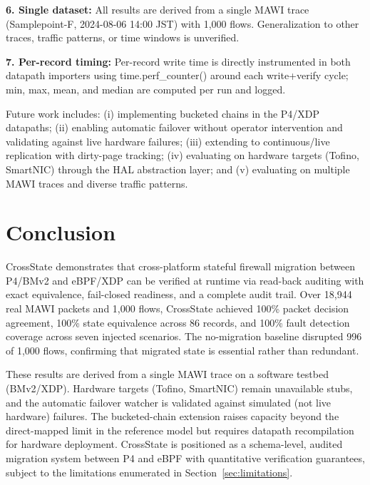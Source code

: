 \documentclass[10pt, conference]{IEEEtran}
\begin{document}
\textbf{6. Single dataset:} All results are derived from a single MAWI trace (Samplepoint-F, 2024-08-06 14:00 JST) with 1,000 flows. Generalization to other traces, traffic patterns, or time windows is unverified.

\textbf{7. Per-record timing:} Per-record write time is directly instrumented in both datapath importers using time.perf\_counter() around each write+verify cycle; min, max, mean, and median are computed per run and logged.

Future work includes: (i) implementing bucketed chains in the P4/XDP datapaths; (ii) enabling automatic failover without operator intervention and validating against live hardware failures; (iii) extending to continuous/live replication with dirty-page tracking; (iv) evaluating on hardware targets (Tofino, SmartNIC) through the HAL abstraction layer; and (v) evaluating on multiple MAWI traces and diverse traffic patterns.

\section{Conclusion}
\label{sec:conclusion}
CrossState demonstrates that cross-platform stateful firewall migration between P4/BMv2 and eBPF/XDP can be verified at runtime via read-back auditing with exact equivalence, fail-closed readiness, and a complete audit trail. Over 18{,}944 real MAWI packets and 1{,}000 flows, CrossState achieved 100\% packet decision agreement, 100\% state equivalence across 86 records, and 100\% fault detection coverage across seven injected scenarios. The no-migration baseline disrupted 996 of 1{,}000 flows, confirming that migrated state is essential rather than redundant.

These results are derived from a single MAWI trace on a software testbed (BMv2/XDP). Hardware targets (Tofino, SmartNIC) remain unavailable stubs, and the automatic failover watcher is validated against simulated (not live hardware) failures. The bucketed-chain extension raises capacity beyond the direct-mapped limit in the reference model but requires datapath recompilation for hardware deployment. CrossState is positioned as a schema-level, audited migration system between P4 and eBPF with quantitative verification guarantees, subject to the limitations enumerated in Section~\ref{sec:limitations}.
\end{document}
